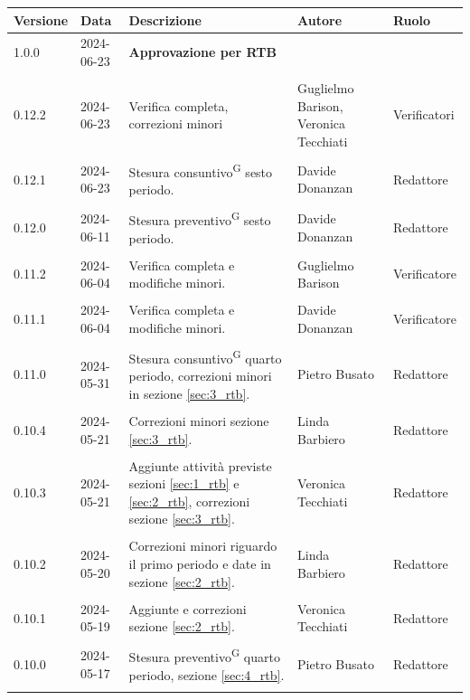 \documentclass[8pt]{article}
\newcommand{\glossterm}[1]{#1\textsuperscript{G}} %
\begin{document}
\begin{table}[ht!]	
\hypersetup{hidelinks}
	\centering
	\begin{tabular}{p{1.2cm} p{2cm} p{6cm} p{3cm} p{2cm}}
		\toprule
		\textbf{Versione}& \textbf{Data} & \textbf{Descrizione} & \textbf{Autore} & \textbf{Ruolo} \\
		\midrule 
		1.0.0 & 2024-06-23 & \textbf{Approvazione per RTB} & & \\\\	
    0.12.2 & 2024-06-23 & Verifica completa, correzioni minori & Guglielmo Barison, Veronica
      Tecchiati & Verificatori  \\\\
    0.12.1 & 2024-06-23 & Stesura \glossterm{consuntivo} sesto periodo. & Davide Donanzan & Redattore \\\\
		0.12.0 & 2024-06-11 & Stesura \glossterm{preventivo} sesto periodo. & Davide Donanzan & Redattore \\\\
		0.11.2 & 2024-06-04 & Verifica completa e modifiche minori. & Guglielmo Barison & Verificatore \\\\
		0.11.1 & 2024-06-04 & Verifica completa e modifiche minori. & Davide Donanzan & Verificatore \\\\
		0.11.0 & 2024-05-31 & Stesura \glossterm{consuntivo} quarto periodo, correzioni minori in sezione \ref{sec:3_rtb}. & Pietro Busato & Redattore \\\\
        0.10.4 & 2024-05-21 & Correzioni minori sezione \ref{sec:3_rtb}. & Linda Barbiero & Redattore \\\\
		0.10.3 & 2024-05-21 & Aggiunte attività previste sezioni \ref{sec:1_rtb} e \ref{sec:2_rtb}, correzioni sezione \ref{sec:3_rtb}. & Veronica Tecchiati & Redattore \\\\
        0.10.2 & 2024-05-20 & Correzioni minori riguardo il primo periodo e date in sezione \ref{sec:2_rtb}. & Linda Barbiero & Redattore \\\\
		0.10.1 & 2024-05-19 & Aggiunte e correzioni sezione \ref{sec:2_rtb}. & Veronica Tecchiati & Redattore \\\\
        0.10.0 & 2024-05-17 & Stesura \glossterm{preventivo} quarto periodo, sezione \ref{sec:4_rtb}. & Pietro Busato & Redattore \\\\

\end{tabular}
\end{table}
\end{document}
